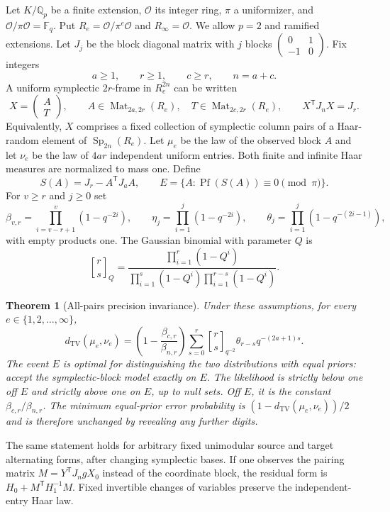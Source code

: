 \documentclass[11pt]{article}
\newtheorem{theorem}{Theorem}
\newcommand{\OO}{\mathcal O}
\newcommand{\F}{\mathbb F}
\newcommand{\Mat}{\operatorname{Mat}}
\newcommand{\Sp}{\operatorname{Sp}}
\newcommand{\TV}{d_{\mathrm{TV}}}
\newcommand{\Pf}{\operatorname{Pf}}
\newcommand{\qbin}[3]{\genfrac{[}{]}{0pt}{}{#1}{#2}_{#3}}
\begin{document}
Let $K/\mathbb Q_p$ be a finite extension, $\OO$ its integer ring, $\pi$ a uniformizer, and $\OO/\pi\OO=\F_q$. Put $R_e=\OO/\pi^e\OO$ and $R_\infty=\OO$. We allow $p=2$ and ramified extensions. Let $J_j$ be the block diagonal matrix with $j$ blocks $\left(\begin{smallmatrix}0&1\\-1&0\end{smallmatrix}\right)$. Fix integers
\[
 a\ge1,\qquad r\ge1,\qquad c\ge r,\qquad n=a+c.
\]
A uniform symplectic $2r$-frame in $R_e^{2n}$ can be written
\[
 X=\begin{pmatrix} A\\T\end{pmatrix},\qquad
 A\in\Mat_{2a,2r}(R_e),\quad T\in\Mat_{2c,2r}(R_e),\qquad
 X^{\mathsf T}J_nX=J_r.
\]
Equivalently, $X$ comprises a fixed collection of symplectic column pairs of a Haar-random element of $\Sp_{2n}(R_e)$. Let $\mu_e$ be the law of the observed block $A$ and let $\nu_e$ be the law of $4ar$ independent uniform entries. Both finite and infinite Haar measures are normalized to mass one. Define
\[
 S(A)=J_r-A^{\mathsf T}J_aA,
 \qquad E=\{A:\Pf(S(A))\equiv0\pmod\pi\}.
\]
For $v\ge r$ and $j\ge0$ set
\[
 \beta_{v,r}=\prod_{i=v-r+1}^{v}(1-q^{-2i}),\qquad
 \eta_j=\prod_{i=1}^j(1-q^{-2i}),\qquad
 \theta_j=\prod_{i=1}^j(1-q^{-(2i-1)}),
\]
with empty products one. The Gaussian binomial with parameter $Q$ is
\[
 \qbin rsQ=\frac{\prod_{i=1}^r(1-Q^i)}{
  \prod_{i=1}^s(1-Q^i)\prod_{i=1}^{r-s}(1-Q^i)}.
\]

\begin{theorem}[All-pairs precision invariance]\label{thm:main}
Under these assumptions, for every $e\in\{1,2,\ldots,\infty\}$,
\begin{equation}\label{eq:tv}
 \boxed{\displaystyle
 \TV(\mu_e,\nu_e)=
 \left(1-\frac{\beta_{c,r}}{\beta_{n,r}}\right)
 \sum_{s=0}^{r}\qbin r{s}{q^{-2}}\theta_{r-s}q^{-(2a+1)s}.}
\end{equation}
The event $E$ is optimal for distinguishing the two distributions with equal priors: accept the symplectic-block model exactly on $E$. The likelihood is strictly below one off $E$ and strictly above one on $E$, up to null sets. Off $E$, it is the constant $\beta_{c,r}/\beta_{n,r}$. The minimum equal-prior error probability is $(1-\TV(\mu_e,\nu_e))/2$ and is therefore unchanged by revealing any further digits.
\end{theorem}

The same statement holds for arbitrary fixed unimodular source and target alternating forms, after changing symplectic bases. If one observes the pairing matrix $M=Y^{\mathsf T}J_n gX_0$ instead of the coordinate block, the residual form is
$H_0+M^{\mathsf T}H_1^{-1}M$. Fixed invertible changes of variables preserve the independent-entry Haar law.
\end{document}
